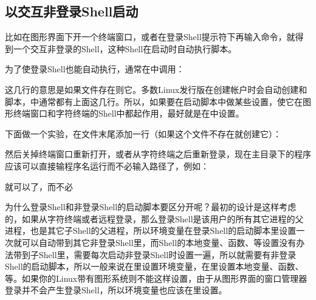 \subsection{以交互非登录Shell启动}
%


比如在图形界面下开一个终端窗口，或者在登录Shell提示符下再输入命令，就得到一个交互非登录的Shell，这种Shell在启动时自动执行脚本。



为了使登录Shell也能自动执行，通常在中调用：




这几行的意思是如果文件存在则它。多数Linux发行版在创建帐户时会自动创建和脚本，中通常都有上面这几行。所以，如果要在启动脚本中做某些设置，使它在图形终端窗口和字符终端的Shell中都起作用，最好就是在中设置。



下面做一个实验，在文件末尾添加一行（如果这个文件不存在就创建它）：




然后关掉终端窗口重新打开，或者从字符终端之后重新登录，现在主目录下的程序应该可以直接输程序名运行而不必输入路径了，例如：




就可以了，而不必




为什么登录Shell和非登录Shell的启动脚本要区分开呢？最初的设计是这样考虑的，如果从字符终端或者远程登录，那么登录Shell是该用户的所有其它进程的父进程，也是其它子Shell的父进程，所以环境变量在登录Shell的启动脚本里设置一次就可以自动带到其它非登录Shell里，而Shell的本地变量、函数、等设置没有办法带到子Shell里，需要每次启动非登录Shell时设置一遍，所以就需要有非登录Shell的启动脚本，所以一般来说在里设置环境变量，在里设置本地变量、函数、等。如果你的Linux带有图形系统则不能这样设置，由于从图形界面的窗口管理器登录并不会产生登录Shell，所以环境变量也应该在里设置。


